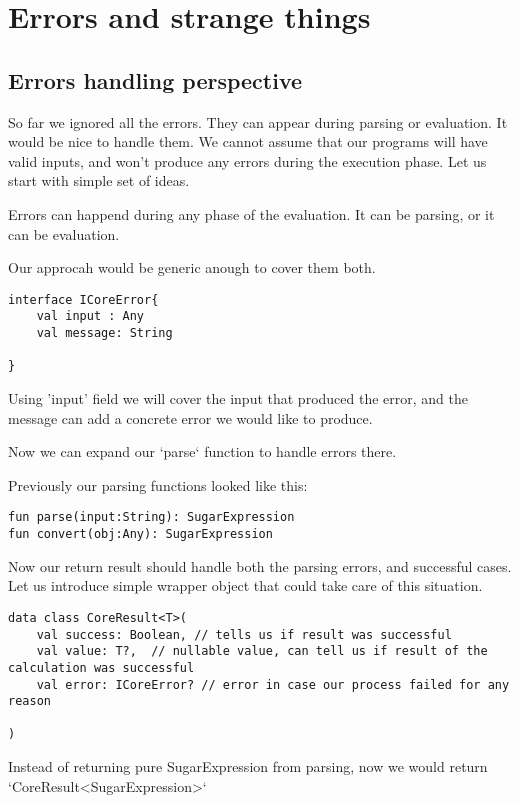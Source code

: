 \documentclass[11pt]{article}
\begin{document}
\section{Errors and strange things}
\label{sec:orgd9043c7}
\subsection{Errors handling perspective}
\label{sec:org299147d}
So far we ignored all the errors. They can appear during parsing or evaluation.
It would be nice to handle them. We cannot assume that our programs will have valid inputs, and won't produce any errors during the execution phase.
Let us start with simple set of ideas.

Errors can happend during any phase of the evaluation. It can be parsing, or it can be evaluation.

Our approcah would be generic anough to cover them both.


\begin{verbatim}
interface ICoreError{
    val input : Any
    val message: String

}
\end{verbatim}

Using 'input' field we will cover the input that produced the error, and the message can add a concrete error we would like to produce.


Now we can expand our `parse` function to handle errors there.

Previously our parsing functions looked like this:
\begin{verbatim}
fun parse(input:String): SugarExpression
fun convert(obj:Any): SugarExpression
\end{verbatim}


Now our return result should handle both the parsing errors, and successful cases.
Let us introduce simple wrapper object that could take care of this situation.


\begin{verbatim}
data class CoreResult<T>(
    val success: Boolean, // tells us if result was successful
    val value: T?,  // nullable value, can tell us if result of the calculation was successful
    val error: ICoreError? // error in case our process failed for any reason

)

\end{verbatim}
Instead of returning pure SugarExpression from parsing, now we would return `CoreResult<SugarExpression>`
\end{document}
